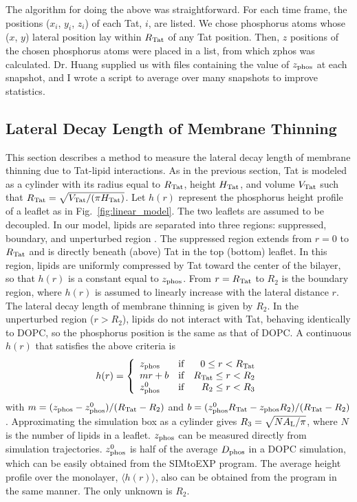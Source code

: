 The algorithm for doing the above was straightforward.  
For each time frame, the positions ($x_i$, $y_i$, $z_i$) of each Tat, $i$, are 
listed.   
We chose phosphorus atoms whose ($x$, $y$) lateral position lay within 
$R_\textrm{Tat}$ of any Tat position. Then, $z$ positions
of the chosen phosphorus atoms were placed in a list, from which
\gls{zphos} was calculated. 
Dr. Huang supplied us with files containing the value of $z_\textrm{phos}$ 
at each snapshot, and I wrote a script to average over many snapshots 
to improve statistics. 

\subsection{Lateral Decay Length of Membrane Thinning}\label{sec:lateral_decay}
This section describes a method to measure the lateral decay length
of membrane thinning due to Tat-lipid interactions. 
As in the previous section, Tat is modeled as a cylinder with 
its radius equal to $R_\textrm{Tat}$, height $H_\textrm{Tat}$,
and volume $V_\textrm{Tat}$ such that $R_\textrm{Tat}=\sqrt{V_\textrm{Tat}/(\pi H_\textrm{Tat})}$. 
Let $h(r)$ represent the phosphorus height profile
of a leaflet as in Fig.~\ref{fig:linear_model}. The two leaflets are assumed to be decoupled.
In our model, lipids are separated into three regions: 
suppressed, boundary, and unperturbed region . 
The suppressed region extends from $r=0$ to $R_\textrm{Tat}$ and is directly beneath 
(above) Tat in the top (bottom) leaflet. In this region, lipids are uniformly 
compressed by Tat toward the 
center of the bilayer, so that $h(r)$ is a constant equal to $z_\textrm{phos}$. 
From $r=R_\textrm{Tat}$ to $R_2$ is the boundary region, where $h(r)$ is assumed to 
linearly increase with the lateral distance $r$. The lateral decay length
of membrane thinning is given by $R_2$. 
In the unperturbed region ($r>R_2$), lipids do not interact with 
Tat, behaving identically to DOPC, so the phosphorus position is the same as that of 
DOPC. A continuous $h(r)$ that 
satisfies the above criteria is
\begin{equation}
  h(r) = \left\{ 
  \begin{array}{lcr}
    z_\textrm{phos}   & \text{if} & 0   \leq r < R_\textrm{Tat} \\
    mr+b     & \text{if} & R_\textrm{Tat} \leq r < R_2 \\
    z_\textrm{phos}^0 & \text{if} & R_2 \leq r < R_3 
  \end{array}\right.  
\end{equation}     
with $m=(z_\textrm{phos}-z_\textrm{phos}^0)/(R_\textrm{Tat}-R_2)$ and $b=(z_\textrm{phos}^0R_\textrm{Tat}-z_\textrm{phos} R_2)/(R_\textrm{Tat}-R_2)$. 
Approximating the simulation box as a cylinder gives 
$R_3=\sqrt{NA_\textrm{L}/\pi}$, where $N$ is the number of lipids in a leaflet. 
$z_\textrm{phos}$ can be measured directly from simulation trajectories.
$z_\textrm{phos}^0$ is half of the average $D_\text{phos}$ in a DOPC simulation,
which can be easily obtained from the SIMtoEXP program. 
The average height profile over
the monolayer, $\langle h(r) \rangle$, also can be obtained from the program 
in the same manner. 
The only unknown is $R_2$.

